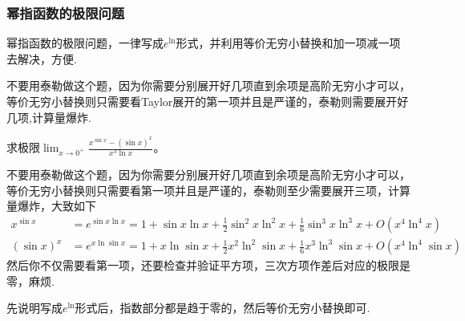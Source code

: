 \documentclass[lang=cn,newtx,10pt,scheme=chinese]{elegantbook}
\begin{document}
\subsubsection{幂指函数的极限问题}
幂指函数的极限问题，一律写成\(e^{\ln}\)形式，并利用等价无穷小替换和加一项减一项去解决，方便.

\begin{remark}
 不要用泰勒做这个题，因为你需要分别展开好几项直到余项是高阶无穷小才可以，等价无穷小替换则只需要看Taylor展开的第一项并且是严谨的，泰勒则需要展开好几项,计算量爆炸.  
\end{remark}
\begin{example}
   求极限\(\lim_{x\rightarrow0^{+}}\frac{x^{\sin x}-(\sin x)^{x}}{x^{3}\ln x}\)。
\end{example}
\begin{remark}
   不要用泰勒做这个题，因为你需要分别展开好几项直到余项是高阶无穷小才可以，等价无穷小替换则只需要看第一项并且是严谨的，泰勒则至少需要展开三项，计算量爆炸，大致如下
   \begin{align*}
   x^{\sin x}&=e^{\sin x\ln x}=1+\sin x\ln x+\frac{1}{2}\sin^{2}x\ln^{2}x+\frac{1}{6}\sin^{3}x\ln^{3}x+O(x^{4}\ln^{4}x)\\
   (\sin x)^{x}&=e^{x\ln\sin x}=1 + x\ln\sin x+\frac{1}{2}x^{2}\ln^{2}\sin x+\frac{1}{6}x^{3}\ln^{3}\sin x+O(x^{4}\ln^{4}\sin x)
   \end{align*}
   然后你不仅需要看第一项，还要检查并验证平方项，三次方项作差后对应的极限是零，麻烦. 
\end{remark}
\begin{note}
   先说明写成\(e^{\ln}\)形式后，指数部分都是趋于零的，然后等价无穷小替换即可.
\end{note}
\end{document}
